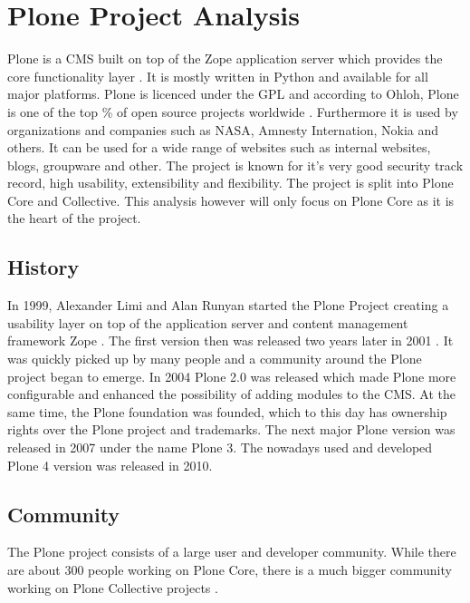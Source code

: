 \section{Plone Project Analysis} %


Plone is a \ac{CMS} built on top of the Zope application server which provides
the core functionality layer \cite{Aspeli2005,PloneFaq,PloneWhatIsPlone}. It is
mostly written in Python and available for all major platforms. Plone is
licenced under the \ac{GPL} and according to Ohloh, Plone is one of the top
\unit[2]{\%} of open source projects worldwide \cite{PloneOhlohFactoids}.
Furthermore it is used by organizations and companies such as NASA, Amnesty
Internation, Nokia and others. It can be used for a wide range of websites such
as internal websites, blogs, groupware and other. The project is known for it's
very good security track record, high usability, extensibility and flexibility.
The project is split into Plone Core and Collective. This analysis however will
only focus on Plone Core as it is the heart of the project.

\subsection{History} %

In 1999, Alexander Limi and Alan Runyan started the Plone Project creating a
usability layer on top of the application server and content management
framework Zope \cite{Aspeli2005,PloneFaq}. The first version then was released
two years later in 2001 \cite{PloneReleases}. It was quickly picked up by many
people and a community around the Plone project began to emerge. In 2004 Plone
2.0 was released which made Plone more configurable and enhanced the
possibility of adding modules to the \ac{CMS}. At the same time, the Plone
foundation was founded, which to this day has ownership rights over the Plone
project and trademarks. The next major Plone version was released in 2007 under
the name Plone 3. The nowadays used and developed Plone 4 version was released
in 2010.


\subsection{Community} %

The Plone project consists of a large user and developer community. While there
are about 300 people working on Plone Core, there is a much bigger community
working on Plone Collective projects
\cite{Aspeli2005,PloneOhlohFactoids,PloneCommunityProcesses}.

